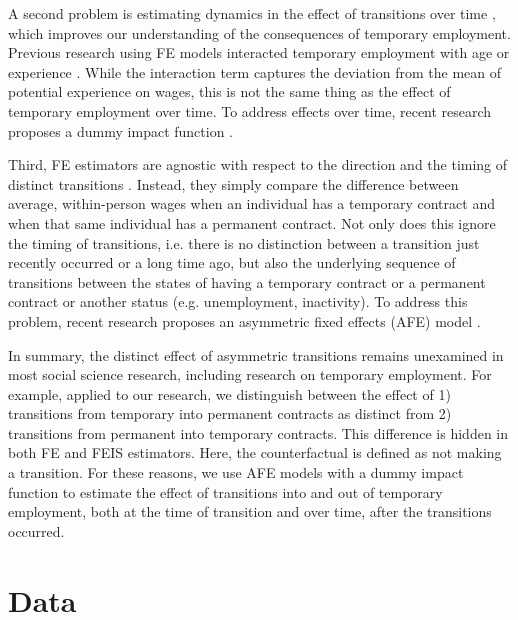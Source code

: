 \documentclass[12pt]{article}
\begin{document}
A second problem is estimating dynamics in the effect of transitions over time \citep{andres_applied_2013}, which improves our understanding of the consequences of temporary employment.  Previous research using FE models interacted temporary employment with age or experience \citep{booth_temporary_2002,mooi-reci_casual_2017}.  While the interaction term captures the deviation from the mean of potential experience on wages, this is not the same thing as the effect of temporary employment over time.  To address effects over time, recent research proposes a dummy impact function \citep{andres_applied_2013,ludwig_what_2021}.  

Third, FE estimators are agnostic with respect to the direction and the timing of distinct transitions \citep{allison_using_1994}.  Instead, they simply compare the difference between average, within-person wages when an individual has a temporary contract and when that same individual has a permanent contract.  Not only does this ignore the timing of transitions, i.e. there is no distinction between a transition just recently occurred or a long time ago, but also the underlying sequence of transitions between the states of having a temporary contract or a permanent contract or another status (e.g. unemployment, inactivity).  To address this problem, recent research proposes an asymmetric fixed effects (AFE) model  \citep{allison_asymmetric_2019}.  

In summary, the distinct effect of asymmetric transitions remains unexamined in most social science research, including research on temporary employment. For example, applied to our research, we distinguish between the effect of 1) transitions from temporary into permanent contracts as distinct from 2) transitions from permanent into temporary contracts.  This difference is hidden in both FE and FEIS estimators.  Here, the counterfactual is defined as not making a transition.  For these reasons, we use AFE models with a dummy impact function to estimate the effect of transitions into and out of temporary employment, both at the time of transition and over time, after the transitions occurred.  

\section{Data}
\end{document}
